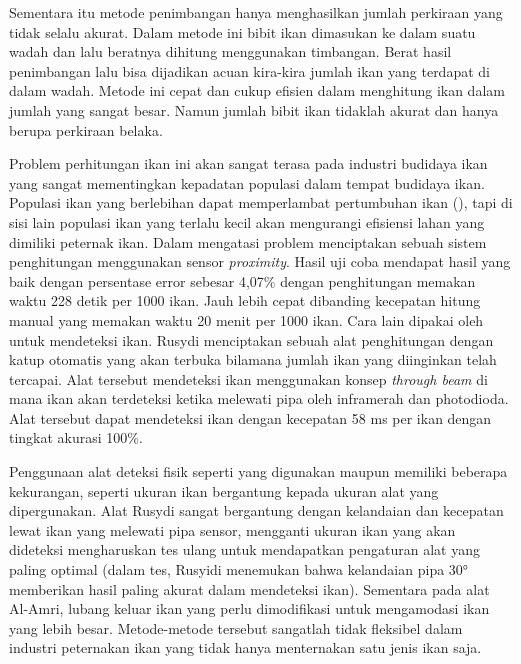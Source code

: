 Sementara itu metode penimbangan hanya menghasilkan jumlah perkiraan yang tidak 
selalu akurat. Dalam metode ini bibit ikan dimasukan ke dalam suatu wadah dan lalu 
beratnya dihitung menggunakan timbangan. Berat hasil penimbangan lalu bisa 
dijadikan acuan kira-kira jumlah ikan yang terdapat di dalam wadah. 
Metode ini cepat dan cukup efisien dalam menghitung ikan dalam jumlah yang 
sangat besar. Namun jumlah bibit ikan tidaklah akurat dan hanya berupa perkiraan belaka.

Problem perhitungan ikan ini akan sangat terasa pada industri budidaya ikan yang 
sangat mementingkan kepadatan populasi dalam tempat budidaya ikan. Populasi ikan 
yang berlebihan dapat memperlambat pertumbuhan ikan (\cite{diansarietal}), tapi 
di sisi lain populasi ikan yang terlalu kecil akan mengurangi efisiensi lahan 
yang dimiliki peternak ikan. Dalam mengatasi problem \cite{alamri} menciptakan 
sebuah sistem penghitungan menggunakan sensor \emph{proximity}. Hasil uji coba mendapat 
hasil yang baik dengan persentase error sebesar 4,07\% dengan penghitungan 
memakan waktu 228 detik per 1000 ikan. Jauh lebih cepat dibanding kecepatan 
hitung manual yang memakan waktu 20 menit per 1000 ikan. Cara lain dipakai 
oleh \cite{rusydi} untuk mendeteksi ikan. Rusydi menciptakan sebuah alat 
penghitungan dengan katup otomatis yang akan terbuka bilamana jumlah ikan 
yang diinginkan telah tercapai. Alat tersebut mendeteksi ikan menggunakan 
konsep \emph{through beam} di mana ikan akan terdeteksi ketika melewati pipa oleh 
inframerah dan photodioda. Alat tersebut dapat mendeteksi ikan dengan 
kecepatan 58 ms per ikan dengan tingkat akurasi 100\%.

Penggunaan alat deteksi fisik seperti yang digunakan \cite{alamri} maupun 
\cite{rusydi} memiliki beberapa kekurangan, seperti ukuran ikan bergantung 
kepada ukuran alat yang dipergunakan. Alat Rusydi sangat bergantung 
dengan kelandaian dan kecepatan lewat ikan yang melewati pipa sensor, mengganti 
ukuran ikan yang akan dideteksi mengharuskan tes ulang untuk 
mendapatkan pengaturan alat yang paling optimal (dalam tes, Rusyidi 
menemukan bahwa kelandaian pipa 30° memberikan hasil paling akurat dalam 
mendeteksi ikan). Sementara pada alat Al-Amri, lubang keluar 
ikan yang perlu dimodifikasi untuk mengamodasi ikan yang lebih besar. 
Metode-metode tersebut sangatlah tidak fleksibel dalam industri peternakan 
ikan yang tidak hanya menternakan satu jenis ikan saja.

